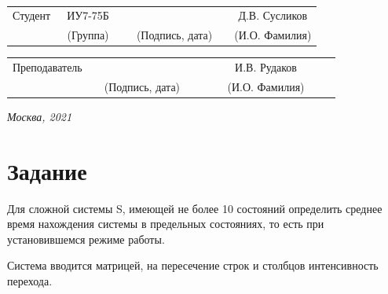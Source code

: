 \documentclass[14pt, a4paper]{extarticle}
\begin{document}
	
	\noindent
	
	\noindent
	\\
	
	\vspace{1.5cm}
	\noindent
	\begin{tabular}{l c c c c c}
		Студент      & ~ИУ7-75Б~               & \hspace{2.5cm} & \hspace{2cm}                 & &  Д.В. 
		Сусликов \\\cline{2-2}\cline{4-4} \cline{6-6} 
		\hspace{3cm} & {\footnotesize(Группа)} &                & {\footnotesize(Подпись, дата)} & & {\footnotesize(И.О. Фамилия)}
	\end{tabular}
	
	\noindent
	\begin{tabular}{l c c c c}
		Преподаватель & \hspace{5cm}   & \hspace{2cm}                 & & ~~~~~~И.В. Рудаков~~~~~~\\\cline{3-3} \cline{5-5} 
		\hspace{3cm}  &                & {\footnotesize(Подпись, дата)} & & {\footnotesize(И.О. Фамилия)}
	\end{tabular}
	
	\vspace{0.6cm}
	\begin{center}	
		\vfill
		\large \textit {Москва, 2021}
	\end{center}
	
	\thispagestyle {empty}
	\pagebreak
	
	\clearpage
	\tableofcontents
		
	\clearpage
	\section*{Задание}
	Для сложной системы S, имеющей не более 10 состояний определить среднее время нахождения системы в предельных состояниях, то есть при установившемся режиме работы. 
		
	Система вводится матрицей, на пересечение строк и столбцов интенсивность перехода. 
	
\end{document}
